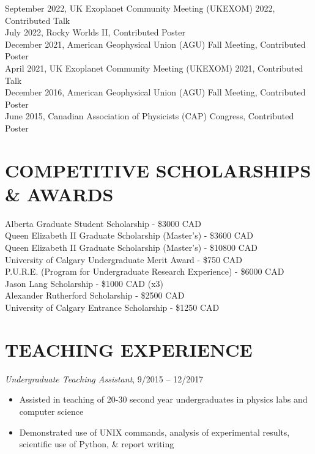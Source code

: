 \documentclass[letter, margin, 10pt]{res} %
\begin{document}
\begin{resume}
\vspace{-4pt}
September 2022, UK Exoplanet Community Meeting (UKEXOM) 2022, Contributed Talk \\
July 2022, Rocky Worlds II, Contributed Poster \\
December 2021, American Geophysical Union (AGU) Fall Meeting, Contributed Poster\\
April 2021, UK Exoplanet Community Meeting (UKEXOM) 2021, Contributed Talk\\
December 2016, American Geophysical Union (AGU) Fall Meeting, Contributed Poster\\
June 2015, Canadian Association of Physicists (CAP) Congress, Contributed Poster

\section{COMPETITIVE SCHOLARSHIPS \& AWARDS}
\vspace{4pt}
Alberta Graduate Student Scholarship - \$3000 CAD\hfill{}\\
Queen Elizabeth II Graduate Scholarship (Master's) - \$3600 CAD\hfill{}\\
Queen Elizabeth II Graduate Scholarship (Master's) - \$10800 CAD\hfill{}\\
University of Calgary Undergraduate Merit Award - \$750 CAD\hfill{}\\
P.U.R.E. (Program for Undergraduate Research Experience) - \$6000 CAD\hfill{}\\
Jason Lang Scholarship - \$1000 CAD (x3)\hfill{}\\
Alexander Rutherford Scholarship - \$2500 CAD\hfill{}\\
University of Calgary Entrance Scholarship - \$1250 CAD\hfill{}
\section{TEACHING EXPERIENCE}

{\sl Undergraduate Teaching Assistant}, 9/2015 -- 12/2017
\begin{itemize}[noitemsep,topsep=0pt,parsep=0pt,partopsep=0pt]
\item Assisted in teaching of 20-30 second year undergraduates in physics labs and computer science 
\item Demonstrated use of UNIX commands, analysis of experimental results, scientific use of Python, \& report writing
\end{itemize}


\end{resume}
\end{document}
